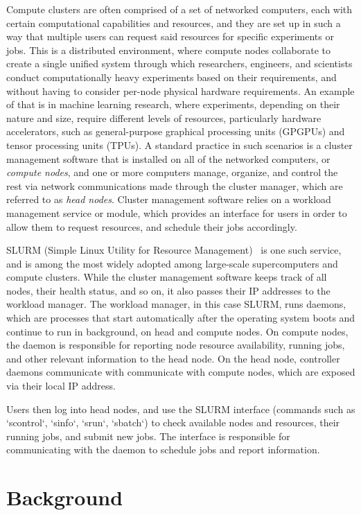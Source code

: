 \documentclass[sigconf]{acmart}
\begin{document}
Compute clusters are often comprised of a set of networked computers, each with certain computational capabilities and 
resources, and they are set up in such a way that multiple users can request said resources for specific experiments or jobs.
This is a distributed environment, where compute nodes collaborate to create a single unified system through which
researchers, engineers, and scientists conduct computationally heavy experiments based on their requirements, and without having
to consider per-node physical hardware requirements.
An example of that is in machine learning research, where experiments, depending on their nature and size, require different
levels of resources, particularly hardware accelerators, such as general-purpose graphical processing units (GPGPUs) and tensor
processing units (TPUs).
A standard practice in such scenarios is a cluster management software that is installed on all of the networked computers, or
\textit{compute nodes}, and one or more computers manage, organize, and control the rest via network communications made through
the cluster manager, which are referred to as \textit{head nodes}.
Cluster management software relies on a workload management service or module, which provides an interface for users in
order to allow them to request resources, and schedule their jobs accordingly.

SLURM (Simple Linux Utility for Resource Management)~\cite{yoo2003slurm} is one such service, and is among the most widely 
adopted among large-scale supercomputers and compute clusters.
While the cluster management software keeps track of all nodes, their health status, and so on, it also passes their IP 
addresses to the workload manager.
The workload manager, in this case SLURM, runs daemons, which are processes that start automatically after 
the operating system boots and continue to run in background, on head and compute nodes.
On compute nodes, the daemon is responsible for reporting node resource availability, running jobs, and other relevant
information to the head node.
On the head node, controller daemons communicate with communicate with compute nodes, which are exposed via their local IP 
address.

Users then log into head nodes, and use the SLURM interface (commands such as `scontrol`, `sinfo`, `srun`, `sbatch`) to check
available nodes and resources, their running jobs, and submit new jobs.
The interface is responsible for communicating with the daemon to schedule jobs and report information.

\section{Background}
\end{document}
